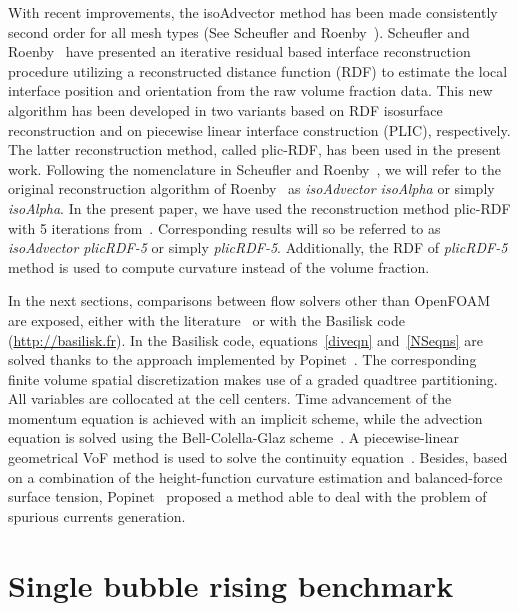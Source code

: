 \documentclass[review]{elsarticle}
\begin{document}
With recent improvements, the isoAdvector method has been made consistently second order for all mesh types (See Scheufler and Roenby~\cite{Scheufler2018}). Scheufler and Roenby~\cite{Scheufler2018} have presented an iterative residual based interface reconstruction procedure utilizing a reconstructed distance function (RDF) to estimate the local interface position and orientation from the raw volume fraction data. This new algorithm has been developed in two variants based on RDF isosurface reconstruction and on piecewise linear interface construction (PLIC), respectively. The latter reconstruction method, called plic-RDF, has been used in the present work. Following the nomenclature in Scheufler and Roenby~\cite{Scheufler2018}, we will refer to the original reconstruction algorithm of Roenby~\cite{Roenby160405} as {\em{isoAdvector isoAlpha}} or simply {\em{isoAlpha}}. In the present paper, we have used the reconstruction method plic-RDF with 5 iterations from~\cite{Scheufler2018}. Corresponding results will so be referred to as {\em{isoAdvector plicRDF-5}} or simply {\em{plicRDF-5}}. Additionally, the RDF of {\em{plicRDF-5}} method is used to compute curvature \cite{Cummins.2005} instead of the volume fraction. 

In the next sections, comparisons between flow solvers other than OpenFOAM are exposed, either with the literature~\cite{Hysing2009} or with the Basilisk code (\url{http://basilisk.fr}). In the Basilisk code, equations~\ref{diveqn} and~\ref{NSeqns} are solved thanks to the approach implemented by Popinet~\citep{popinet2015}. The corresponding finite volume spatial discretization makes use of a graded quadtree partitioning. All variables are collocated at the cell centers. Time advancement of the momentum equation is achieved with an implicit scheme, while the advection equation is solved using the Bell-Colella-Glaz scheme~\cite{bell1989}. A piecewise-linear geometrical VoF method is used to solve the continuity equation~\cite{popinet2009}. Besides, based on a combination of the height-function curvature estimation and balanced-force surface tension, Popinet~\cite{popinet2009} proposed a method able to deal with the problem of spurious currents generation.

\section{Single bubble rising benchmark}\label{sec_hysingcase}
\end{document}
